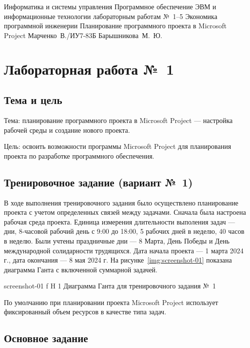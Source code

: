 \documentclass{bmstu}
\begin{document}
\makereporttitle
    {Информатика и системы управления}
    {Программное обеспечение ЭВМ и информационные технологии}
    {лабораторным работам №~1--5}
    {Экономика программной инженерии}
    {Планирование программного проекта в Microsoft Project}
    {}
    {Марченко~В./ИУ7-83Б}
    {Барышникова~М.~Ю.}

{\centering \maketableofcontents}

\chapter{Лабораторная работа №~1}

\section{Тема и цель}

Тема: планирование программного проекта в Microsoft Project --- настройка рабочей среды и создание нового проекта.

Цель: освоить возможности программы Microsoft Project для планирования проекта по разработке программного обеспечения.

\section{Тренировочное задание (вариант №~1)}

В ходе выполнения тренировочного задания было осуществлено планирование проекта с учетом определенных связей между задачами. 
Сначала была настроена рабочая среда проекта. 
Единица измерения длительности выполения задач --- дни, 8-часовой рабочий день с 9:00 до 18:00, 5 рабочих дней в неделю, 40 часов в неделю. 
Были учтены праздничные дни --- 8 Марта, День Победы и День международной солидарности трудящихся. 
Дата начала проекта --- 1 марта 2024 г., дата окончания --- 8 мая 2024 г. 
На рисунке~\ref{img:screenshot-01} показана диаграмма Ганта с включенной суммарной задачей.
    
    {screenshot-01}
    {f}
    {H}
    {1\textwidth}
    {Диаграмма Ганта для тренировочного задания №~1}
    
По умолчанию при планировании проекта Microsoft Project использует фиксированный объем ресурсов в качестве типа задач.
    
\section{Основное задание}
\end{document}
